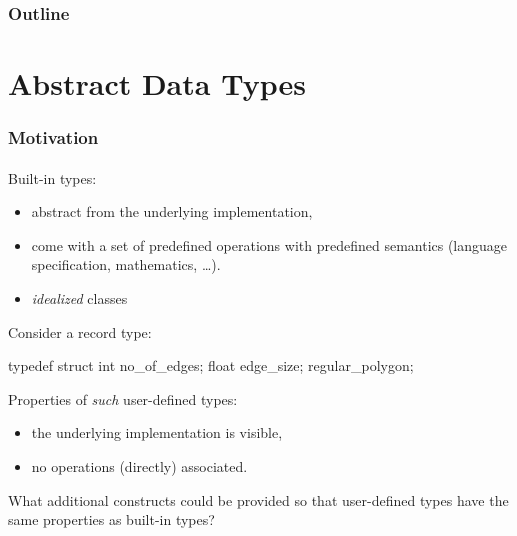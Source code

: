 \documentclass{beamer}
\begin{document}
\begin{frame}
  \frametitle{Outline}
  \tableofcontents
\end{frame}

\section{Abstract Data Types}

\begin{frame}[fragile]
\frametitle{Motivation}
\framesubtitle{}
Built-in types:
\begin{itemize}
\item abstract from the underlying implementation, 
\item come with a set of predefined operations with predefined semantics
(language specification, mathematics, \ldots).
\item \emph{idealized} classes
\end{itemize}
\bigskip

Consider a record type:
\begin{cplus2}
       typedef struct {
          int   no_of_edges;
          float edge_size;
       } regular_polygon;
\end{cplus2}
Properties of \textit{such} user-defined types:
\begin{itemize}
\item the underlying implementation is visible,
\item no operations  (directly) associated. 
\end{itemize}
\bigskip

What additional constructs could be provided so that user-defined types
have the same properties as built-in types?

\end{frame}
\end{document}
